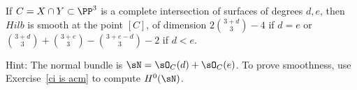 \begin{exercise}\label{hilb at a ci}
If $C = X\cap Y\subset \PP^3$ is a complete intersection of surfaces of degrees $d,e$, then
$Hilb$ is smooth at the point $[C]$, of dimension $2\binom{3+d}{3}-4$ if $d=e$
or $\binom{3+d}{3} +\binom{3+e}{3} -\binom{3+e-d}{3} -2$ if $d<e$.

Hint: The normal bundle is $\sN = \sO_C(d)+\sO_C(e)$. To prove smoothness, use
Exercise~\ref{ci is acm} to compute $H^0(\sN)$.
\end{exercise}



